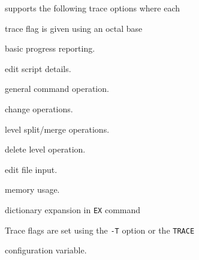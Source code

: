 









 supports the following trace options where each


trace flag is given using an octal base


\begin{optlist}


    basic progress reporting.


    edit script details.


    general command operation.


    change operations.


    level split/merge operations.


    delete level operation.


    edit file input.


    memory usage.


    dictionary expansion in \texttt{EX} command


\end{optlist}


Trace flags are set using the \texttt{-T} option or the  \texttt{TRACE} 


configuration variable.


















